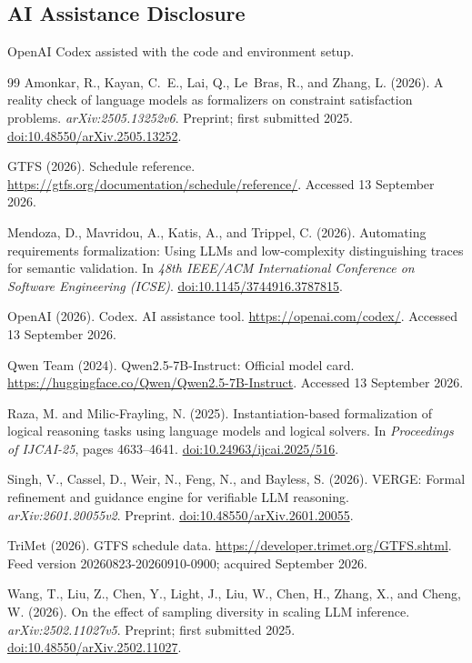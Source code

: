 \documentclass[a4paper,twoside]{article}
\begin{document}
\subsection*{AI Assistance Disclosure}
\label{sec:ai}
OpenAI Codex \cite{codex} assisted with the code and environment setup.


\begin{thebibliography}{99}
Amonkar, R., Kayan, C.~E., Lai, Q., Le~Bras, R., and Zhang, L. (2026).
A reality check of language models as formalizers on constraint satisfaction problems.
\emph{arXiv:2505.13252v6}. Preprint; first submitted 2025.
\href{https://arxiv.org/abs/2505.13252v6}{doi:10.48550/arXiv.2505.13252}.

GTFS (2026). Schedule reference.
\url{https://gtfs.org/documentation/schedule/reference/}. Accessed 13 September 2026.

Mendoza, D., Mavridou, A., Katis, A., and Trippel, C. (2026).
Automating requirements formalization: Using LLMs and low-complexity distinguishing traces for semantic validation.
In \emph{48th IEEE/ACM International Conference on Software Engineering (ICSE)}.
\href{https://doi.org/10.1145/3744916.3787815}{doi:10.1145/3744916.3787815}.

OpenAI (2026). Codex. AI assistance tool.
\url{https://openai.com/codex/}. Accessed 13 September 2026.

Qwen Team (2024). Qwen2.5-7B-Instruct: Official model card.
\url{https://huggingface.co/Qwen/Qwen2.5-7B-Instruct}. Accessed 13 September 2026.

Raza, M. and Milic-Frayling, N. (2025).
Instantiation-based formalization of logical reasoning tasks using language models and logical solvers.
In \emph{Proceedings of IJCAI-25}, pages 4633--4641.
\href{https://doi.org/10.24963/ijcai.2025/516}{doi:10.24963/ijcai.2025/516}.

Singh, V., Cassel, D., Weir, N., Feng, N., and Bayless, S. (2026).
VERGE: Formal refinement and guidance engine for verifiable LLM reasoning.
\emph{arXiv:2601.20055v2}. Preprint.
\href{https://arxiv.org/abs/2601.20055v2}{doi:10.48550/arXiv.2601.20055}.

TriMet (2026). GTFS schedule data.
\url{https://developer.trimet.org/GTFS.shtml}. Feed version 20260823-20260910-0900; acquired September 2026.

Wang, T., Liu, Z., Chen, Y., Light, J., Liu, W., Chen, H., Zhang, X., and Cheng, W. (2026).
On the effect of sampling diversity in scaling LLM inference.
\emph{arXiv:2502.11027v5}. Preprint; first submitted 2025.
\href{https://arxiv.org/abs/2502.11027v5}{doi:10.48550/arXiv.2502.11027}.
\end{thebibliography}
\end{document}
